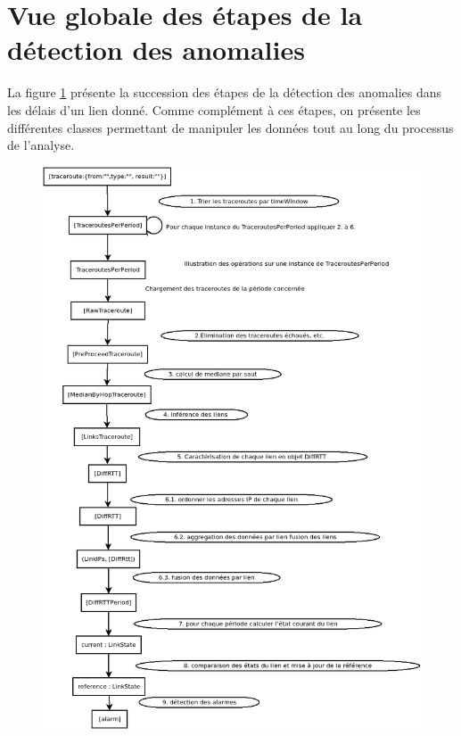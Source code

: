 \documentclass[]{report}
\begin{document}
\section{Vue globale des étapes de la détection des anomalies}
La figure 	\ref{fig:process-rttanalysis2} présente la succession des étapes de la détection des anomalies dans les délais d'un lien donné. Comme complément à ces étapes, on présente les différentes classes permettant de manipuler les données tout au long du processus de l'analyse.
\begin{figure}[h]
	\centering
	\includegraphics[width=1\linewidth]{../dia/process-rttanalysis_2}
	\caption{}
	\label{fig:process-rttanalysis2}
\end{figure}


\begin{figure}[h]
	\centering
		\resizebox{\textwidth}{\textheight}{
	
}
	\caption{}
	\label{fig:process-rttanalysis_tex}
\end{figure}
\end{document}
